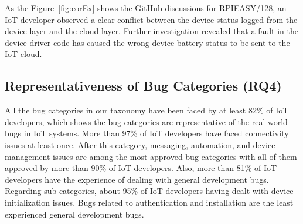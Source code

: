 As the Figure~\autoref{fig:corEx} shows the GitHub discussions for RPIEASY/128, an IoT developer observed a clear conflict between the device status logged from the device layer and the cloud layer. Further investigation revealed that a fault in the device driver code has caused the wrong device battery status to be sent to the IoT cloud.

 \begin{table}[htbp]
\caption{Bug Categories with Positive Correlation}
\begin{center}
\label{tab:correlations}
\end{center}
\end{table}

\subsection{Representativeness of Bug Categories (RQ4)}
All the bug categories in our taxonomy have been faced by at least 82\% of IoT developers, which shows the bug categories are representative of the real-world bugs in IoT systems. More than 97\% of IoT developers have faced connectivity issues at least once.  After this category, messaging, automation, and device management issues are among the most approved bug categories with all of them approved by more than 90\% of IoT developers. Also, more than 81\% of IoT developers have the experience of dealing with general development bugs. Regarding sub-categories, about 95\% of IoT developers having dealt with device initialization issues. Bugs related to authentication and installation are the least experienced general development bugs. 

